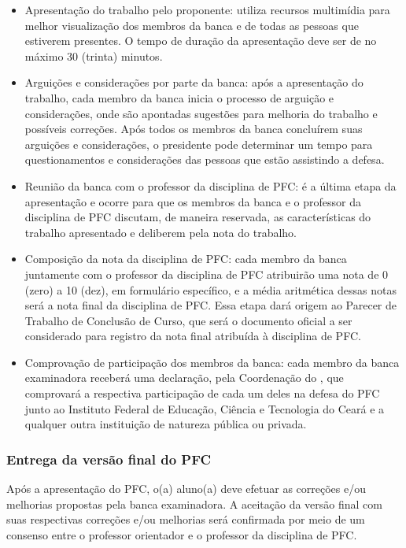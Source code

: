 \begin{itemize}
	\item Apresentação do trabalho pelo proponente: utiliza recursos multimídia para melhor visualização dos membros da banca e de todas as pessoas que estiverem presentes. O tempo de duração da apresentação deve ser de no máximo 30 (trinta) minutos.
	\item Arguições e considerações por parte da banca: após a apresentação do trabalho, cada membro da banca inicia o processo de arguição e considerações, onde são apontadas sugestões para melhoria do trabalho e possíveis correções. Após todos os membros da banca concluírem suas arguições e considerações, o presidente pode determinar um tempo para questionamentos e considerações das pessoas que estão assistindo a defesa.
	\item Reunião da banca com o professor da disciplina de PFC: é a última etapa da apresentação e ocorre para que os membros da banca e o professor da disciplina de PFC discutam, de maneira reservada, as características do trabalho apresentado e deliberem pela nota do trabalho.
	\item Composição da nota da disciplina de PFC: cada membro da banca juntamente com o professor da disciplina de PFC atribuirão uma nota de 0 (zero) a 10 (dez), em formulário específico, e a média aritmética dessas notas será a nota final da disciplina de PFC. Essa etapa dará origem ao Parecer de Trabalho de Conclusão de Curso, que será o documento oficial a ser considerado para registro da nota final atribuída à disciplina de PFC.
	\item Comprovação de participação dos membros da banca: cada membro da banca examinadora receberá uma declaração, pela Coordenação do \NOMECURSO, que comprovará a respectiva participação de cada um deles na defesa do PFC junto ao Instituto Federal de Educação, Ciência e Tecnologia do Ceará e a qualquer outra instituição de natureza pública ou privada.
\end{itemize}

\subsubsection{Entrega da versão final do PFC}

Após a apresentação do PFC, o(a) aluno(a) deve efetuar as correções e/ou melhorias propostas pela banca examinadora. A aceitação da versão final com suas respectivas correções e/ou melhorias será confirmada por meio de um consenso entre o professor orientador e o professor da disciplina de PFC.

